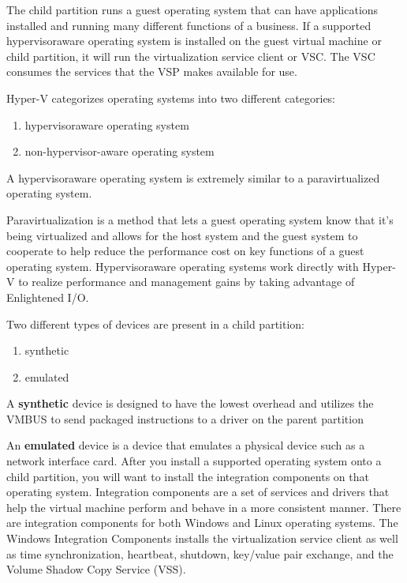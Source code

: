 The child partition runs a guest operating system that can have applications installed and running many different functions of a business. If a supported hypervisoraware operating system is installed on the guest virtual machine or child partition, it will run the virtualization service client or VSC. The VSC consumes the services that the VSP makes available for use.

\vspace{5mm}

Hyper-V categorizes operating systems into two different categories:
\begin{enumerate}
	\item hypervisoraware operating system 
	\item non-hypervisor-aware operating system
\end{enumerate}

\vspace{5mm}

A hypervisoraware operating system is extremely similar to a paravirtualized operating system.

\vspace{5mm}

Paravirtualization is a method that lets a guest operating system know that it’s being virtualized and allows for the host system and the guest system to cooperate to help
reduce the performance cost on key functions of a guest operating system. Hypervisoraware operating systems work directly with Hyper-V to realize performance and management gains by taking advantage of Enlightened I/O.

\vspace{5mm}

Two different types of devices are present in a child partition:
\begin{enumerate}
	\item synthetic
	\item emulated
\end{enumerate}


A \textbf{synthetic} device is designed to have the lowest overhead and utilizes the VMBUS to send packaged instructions to a driver on the parent partition

\vspace{5mm}

An \textbf{emulated} device is a device that emulates a physical device such as a network interface card. After you install a supported operating system onto a child partition, 
you will want to install the integration components on that operating system. Integration components are a set of services and drivers that help the virtual machine perform and behave 
in a more consistent manner. There are integration components for both Windows and Linux operating systems. The Windows Integration Components installs the virtualization service client 
as well as time synchronization, heartbeat, shutdown, key/value pair exchange, and the Volume Shadow Copy Service (VSS).

